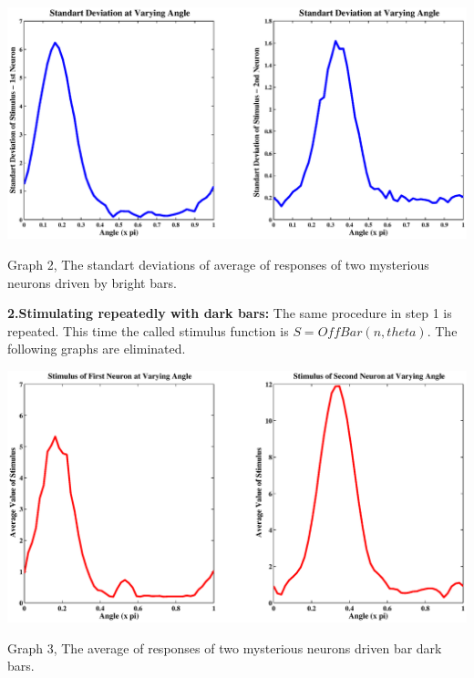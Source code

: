\documentclass{article}
\begin{document}
\begin{center}
 \includegraphics[width=\textwidth]{std_on.eps}
\begin{footnotesize}Graph 2, The standart deviations of average of responses of two mysterious neurons driven by bright bars. \end{footnotesize}
\end{center}

\setcounter{tocdepth}{1}
\textbf{2.Stimulating repeatedly with dark bars:} The same procedure in step 1 is repeated. This time the called stimulus function is $S=OffBar(n, theta)$. The following graphs are eliminated.

\begin{center}
 \includegraphics[width=\textwidth]{f1_off.eps}
\begin{footnotesize}Graph 3, The average of responses of two mysterious neurons driven bar dark bars. \end{footnotesize}
\end{center}
\end{document}
